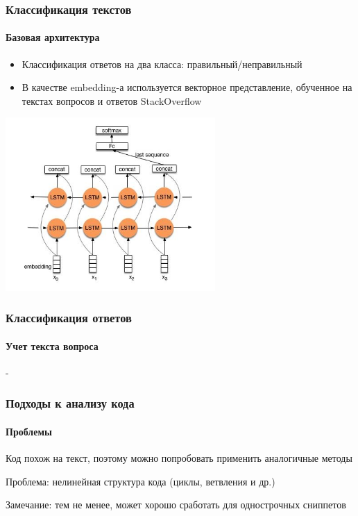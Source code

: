 \documentclass[10pt]{beamer}
\begin{document}

\begin{frame}
\frametitle{Классификация текстов}
\framesubtitle{Базовая архитектура}

\begin{itemize}
	\item Классификация ответов на два класса: правильный/неправильный
	\item В качестве embedding-а используется векторное представление, обученное на текстах вопросов и ответов StackOverflow
\end{itemize}

\begin{center}
\includegraphics[width=0.6\textwidth]{images/bilstm_text_classification.jpg}
\end{center}

\end{frame}


\begin{frame}
\frametitle{Классификация ответов}
\framesubtitle{Учет текста вопроса}

-

\begin{center}
\end{center}

\end{frame}


\begin{frame}
\frametitle{Подходы к анализу кода}
\framesubtitle{Проблемы}

Код похож на текст, поэтому можно попробовать применить аналогичные методы

Проблема: нелинейная структура кода (циклы, ветвления и др.)

\medskip

\footnotesize{Замечание: тем не менее, может хорошо сработать для однострочных сниппетов}

\end{frame}
\end{document}
